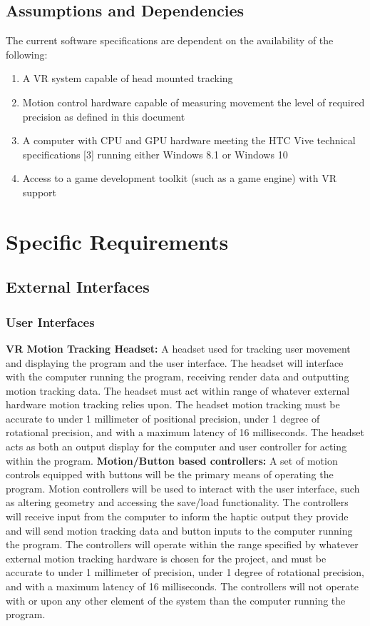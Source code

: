 \documentclass[onecolumn, draftclsnofoot,10pt, compsoc]{IEEEtran}
\begin{document}
\subsection{Assumptions and Dependencies}
The current software specifications are dependent on the availability of the following:
\begin{enumerate}
	\item A VR system capable of head mounted tracking
	\item Motion control hardware capable of measuring movement the level of required precision as defined in this document
	\item A computer with CPU and GPU hardware meeting the HTC Vive technical specifications [3] running either Windows 8.1 or Windows 10
	\item Access to a game development toolkit (such as a game engine) with VR support
\end{enumerate}
\section{Specific Requirements}
\subsection{External Interfaces}
\subsubsection{User Interfaces}
\textbf{VR Motion Tracking Headset:}
\newline
A headset used for tracking user movement and displaying the program and the user interface. The headset will interface with the computer running the program, receiving render data and outputting motion tracking data. The headset must act within range of whatever external hardware motion tracking relies upon. The headset motion tracking must be accurate to under 1 millimeter of positional precision, under 1 degree of rotational precision, and with a maximum latency of 16 milliseconds. The headset acts as both an output display for the computer and user controller for acting within the program. 
\newline
\textbf{Motion/Button based controllers:}
\newline
A set of motion controls equipped with buttons will be the primary means of operating the program. Motion controllers will be used to interact with the user interface, such as altering geometry and accessing the save/load functionality. 
The controllers will receive input from the computer to inform the haptic output they provide and will send motion tracking data and button inputs to the computer running the program. The controllers will operate within the range specified by whatever external motion tracking hardware is chosen for the project, and must be accurate to under 1 millimeter of precision, under 1 degree of rotational precision, and with a maximum latency of 16 milliseconds. The controllers will not operate with or upon any other element of the system than the computer running the program.
\end{document}
